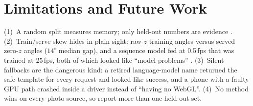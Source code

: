 \section{Limitations and Future Work}\label{sec:limits}
 (1)~A random split measures memory; only held-out numbers are evidence \cite{kapoor2023leakage}. (2)~Train/serve skew hides in plain sight: raw-$z$ training angles versus served zero-$z$ angles ($14^\circ$ median gap), and a sequence model fed at 0.5\,fps that was trained at 25\,fps, both of which looked like ``model problems'' \cite{sculley2015debt}. (3)~Silent fallbacks are the dangerous kind: a retired language-model name returned the safe template for every request and looked like success, and a phone with a faulty GPU path crashed inside a driver instead of ``having no WebGL''. (4)~No method wins on every photo source, so report more than one held-out set.

